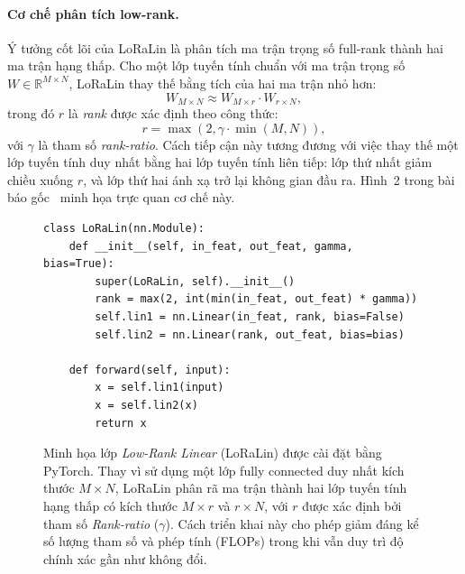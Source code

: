 \paragraph{Cơ chế phân tích low-rank.} 
Ý tưởng cốt lõi của LoRaLin là phân tích ma trận trọng số full-rank thành hai ma trận hạng thấp. Cho một lớp tuyến tính chuẩn với ma trận trọng số $W \in \mathbb{R}^{M \times N}$, LoRaLin thay thế bằng tích của hai ma trận nhỏ hơn:
\[
    W_{M \times N} \approx W_{M \times r} \cdot W_{r \times N},
\]
trong đó $r$ là \textit{rank} được xác định theo công thức:
\[
    r = \max(2, \gamma \cdot \min(M,N)),
\]
với $\gamma$ là tham số \textit{rank-ratio}. Cách tiếp cận này tương đương với việc thay thế một lớp tuyến tính duy nhất bằng hai lớp tuyến tính liên tiếp: lớp thứ nhất giảm chiều xuống $r$, và lớp thứ hai ánh xạ trở lại không gian đầu ra. Hình~2 trong bài báo gốc~\cite{george2024edgeface} minh họa trực quan cơ chế này.\\
\begin{figure}[ht]
    \centering
 

\begin{verbatim}
class LoRaLin(nn.Module):
    def __init__(self, in_feat, out_feat, gamma, bias=True):
        super(LoRaLin, self).__init__()
        rank = max(2, int(min(in_feat, out_feat) * gamma))
        self.lin1 = nn.Linear(in_feat, rank, bias=False)
        self.lin2 = nn.Linear(rank, out_feat, bias=bias)

    def forward(self, input):
        x = self.lin1(input)
        x = self.lin2(x)
        return x
\end{verbatim}

    \caption{Minh họa lớp \textit{Low-Rank Linear} (LoRaLin) được cài đặt bằng PyTorch. 
    Thay vì sử dụng một lớp fully connected duy nhất kích thước $M \times N$, LoRaLin phân rã ma trận thành hai lớp tuyến tính hạng thấp có kích thước $M \times r$ và $r \times N$, 
    với $r$ được xác định bởi tham số \textit{Rank-ratio} ($\gamma$). 
    Cách triển khai này cho phép giảm đáng kể số lượng tham số và phép tính (FLOPs) trong khi vẫn duy trì độ chính xác gần như không đổi.}
    \label{fig:lora_lin}
\end{figure}



